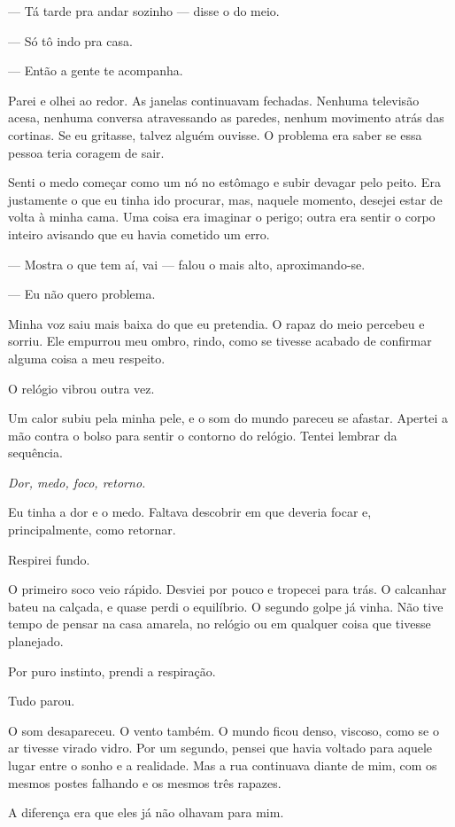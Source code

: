 — Tá tarde pra andar sozinho — disse o do meio.

— Só tô indo pra casa.

— Então a gente te acompanha.

Parei e olhei ao redor. As janelas continuavam fechadas. Nenhuma televisão acesa, nenhuma conversa atravessando as paredes, nenhum movimento atrás das cortinas. Se eu gritasse, talvez alguém ouvisse. O problema era saber se essa pessoa teria coragem de sair.

Senti o medo começar como um nó no estômago e subir devagar pelo peito. Era justamente o que eu tinha ido procurar, mas, naquele momento, desejei estar de volta à minha cama. Uma coisa era imaginar o perigo; outra era sentir o corpo inteiro avisando que eu havia cometido um erro.

— Mostra o que tem aí, vai — falou o mais alto, aproximando-se.

— Eu não quero problema.

Minha voz saiu mais baixa do que eu pretendia. O rapaz do meio percebeu e sorriu. Ele empurrou meu ombro, rindo, como se tivesse acabado de confirmar alguma coisa a meu respeito.

O relógio vibrou outra vez.

Um calor subiu pela minha pele, e o som do mundo pareceu se afastar. Apertei a mão contra o bolso para sentir o contorno do relógio. Tentei lembrar da sequência.

\emph{Dor, medo, foco, retorno.}

Eu tinha a dor e o medo. Faltava descobrir em que deveria focar e, principalmente, como retornar.

Respirei fundo.

O primeiro soco veio rápido. Desviei por pouco e tropecei para trás. O calcanhar bateu na calçada, e quase perdi o equilíbrio. O segundo golpe já vinha. Não tive tempo de pensar na casa amarela, no relógio ou em qualquer coisa que tivesse planejado.

Por puro instinto, prendi a respiração.

Tudo parou.

O som desapareceu. O vento também. O mundo ficou denso, viscoso, como se o ar tivesse virado vidro. Por um segundo, pensei que havia voltado para aquele lugar entre o sonho e a realidade. Mas a rua continuava diante de mim, com os mesmos postes falhando e os mesmos três rapazes.

A diferença era que eles já não olhavam para mim.

